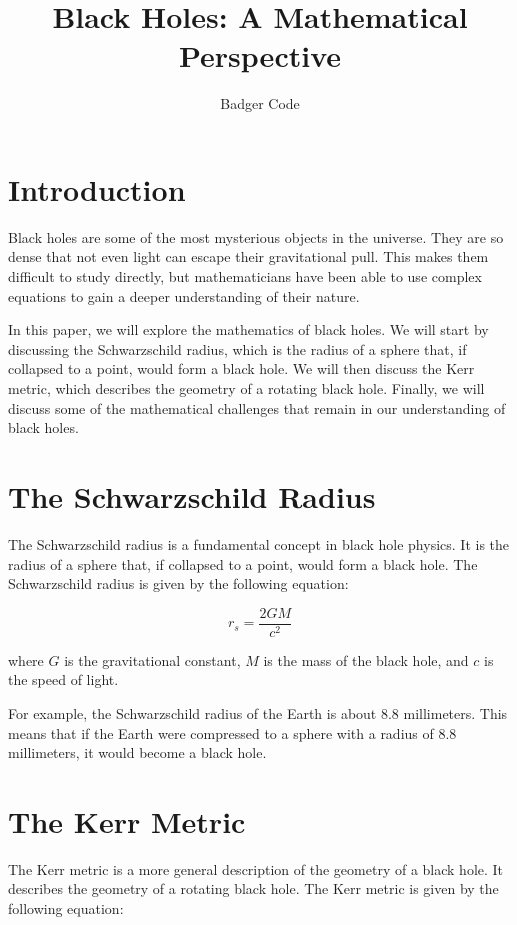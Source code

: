 \documentclass{article}
\begin{document}
\title{Black Holes: A Mathematical Perspective}

\author{Badger Code}

\maketitle

\section{Introduction}

Black holes are some of the most mysterious objects in the universe. They are so dense that not even light can escape their gravitational pull. This makes them difficult to study directly, but mathematicians have been able to use complex equations to gain a deeper understanding of their nature.

In this paper, we will explore the mathematics of black holes. We will start by discussing the Schwarzschild radius, which is the radius of a sphere that, if collapsed to a point, would form a black hole. We will then discuss the Kerr metric, which describes the geometry of a rotating black hole. Finally, we will discuss some of the mathematical challenges that remain in our understanding of black holes.

\section{The Schwarzschild Radius}

The Schwarzschild radius is a fundamental concept in black hole physics. It is the radius of a sphere that, if collapsed to a point, would form a black hole. The Schwarzschild radius is given by the following equation:

$$r_s = \frac{2GM}{c^2}$$

where $G$ is the gravitational constant, $M$ is the mass of the black hole, and $c$ is the speed of light.

For example, the Schwarzschild radius of the Earth is about 8.8 millimeters. This means that if the Earth were compressed to a sphere with a radius of 8.8 millimeters, it would become a black hole.

\section{The Kerr Metric}

The Kerr metric is a more general description of the geometry of a black hole. It describes the geometry of a rotating black hole. The Kerr metric is given by the following equation:
\end{document}
